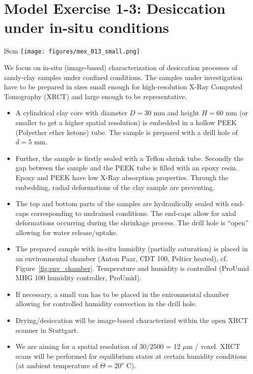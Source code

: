 \section[MEX 1-3: Desiccation under in-situ conditions]{Model Exercise 1-3: Desiccation under in-situ conditions}
\label{sec:mex12}
\begin{wrapfigure}{l}{8cm}
\centering
\texttt{[image: figures/mex\_013\_small.png]}
\caption{Anton Paar MCR~502 TwinDrive DMTA-rheometer with ProUmid MHG~100 humidity controller.}
\label{fig:env_chamber}
\end{wrapfigure}

We focus on in-situ (image-based) characterization of desiccation processes of sandy-clay samples under confined conditions. The samples under investigation
have to be prepared in sizes small enough for high-resolution X-Ray Computed Tomography (XRCT) and large enough to be representative.

\begin{itemize}
\item A cylindrical clay core with diameter $D=30$ mm and height 
$H=60$ mm (or smaller to get a higher spatial resolution) is embedded in a hollow PEEK (Polyether ether ketone) tube. 
The sample is prepared with a drill hole of $d=5$ mm.
\item Further, the sample is firstly sealed with a Teflon shrink tube. Secondly the gap between the sample and the PEEK tube is filled with an epoxy resin.
Epoxy and PEEK have low X-Ray absorption properties. Through the embedding, radial deformations of the clay sample are preventing. 
\item The top and bottom parts of the samples are hydraulically sealed with end-caps corresponding to undrained conditions. The end-caps allow for axial deformations occurring during the shrinkage process. The drill hole is ``open''  allowing for water release/uptake.
\item The prepared sample with in-situ humidity (partially saturation) is placed in an environmental chamber (Anton Paar, CDT 100, Peltier heated), cf. Figure~\ref{fig:env_chamber}. Temperature and humidity is controlled (ProUmid MHG 100 humidity controller, ProUmid). 
\item If necessary, a small van has to be placed in the enironmental chamber allowing for controlled humidity convection in the drill hole. 
\item Drying/desiccation will be image-based characterized within the open XRCT scanner in Stuttgart. 
\item We are aiming for a spatial resolution of $30 / 2500$ = 12 $\mu$m / voxel. XRCT scans will be performed for equilibrium states at certain humidity conditions (at ambient temperature of $\Theta = 20^o$ C).
\end{itemize}
